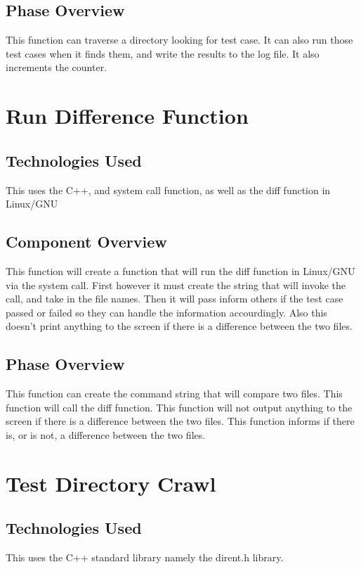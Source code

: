 \subsection{Phase Overview}
This function can traverse a directory looking for test case.  It can also run those 
test cases when it finds them, and write the results to the log file.  It also increments
the counter. 


\section{Run Difference Function}

\subsection{Technologies  Used}
This uses the C++, and system call function, as well as the diff function in Linux/GNU

\subsection{Component  Overview}
This function will create a function that will run the diff function in Linux/GNU via the system call.
First however it must create the string that will invoke the call, and take in the file names. Then it 
will pass inform others if the test case passed or failed so they can handle the information accourdingly. 
Also this doesn't print anything to the screen if there is a difference between the two files.

\subsection{Phase Overview}
This function can create the command string that will compare two files. This function will call the diff 
function. This function will not output anything to the screen if there is a difference between the two files. 
This function informs if there is, or is not, a difference between the two files.



\section{Test Directory Crawl}

\subsection{Technologies Used}
This uses the C++ standard library namely the dirent.h library.

